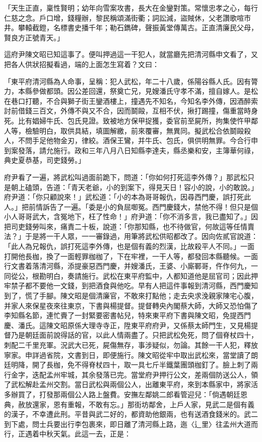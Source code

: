 \begin{showcontents}{}
「天生正直，稟性賢明；幼年向雪案攻書，長大在金鑾對策。常懷忠孝之心，每行仁慈之念。戶口增，錢糧辦，黎民稱頌滿街衢；詞訟減，盜賊休，父老讚歌喧市井。攀轅截鐙，名標書史播千年；勒石鐫碑，聲振黃堂傳萬古。正直清廉民父母，賢良方正號青天。」

這府尹陳文昭已知這事了。便叫押過這一干犯人，就當廳先把清河縣申文看了，又把各人供狀招擬看過，端的上面怎生寫着？文曰：

「東平府清河縣為人命事，呈稱：犯人武松，年二十八歲，係陽谷縣人氏。因有膂力，本縣參做都頭。因公差回還，祭奠亡兄，見嫂潘氏守孝不滿，擅自嫁人。是松在巷口打聽，不合與獅子街王鑾酒樓上，撞遇先不知名，今知名李外傳，因酒醉索討前借錢三百文，外傳不與又不合，因而鬬毆，互相不伏，揪打踢撞，傷重當時身死。比有娼婦牛氏、包氏見證。致被地方保甲捉獲，委官前至屍所，拘集使忤甲鄰人等，檢驗明白，取供具結，填圖解繳，前來覆審，無異同。擬武松合依鬬毆殺人，不問手足他物金刃，律絞。酒保王鸞，并牛氏、包氏，俱供明無罪。今合行申到案發落，請允施行。政和三年八月八日知縣李達夫，縣丞樂和安，主簿華何祿，典史夏恭基，司吏錢勞。」

府尹看了一遍，將武松叫過面前跪下，問道：「你如何打死這李外傳？」那武松只是朝上磕頭，告道：「青天老爺，小的到案下，得見天日！容小的說，小的敢說。」府尹道：「你只顧說來！」武松道：「小的本為哥哥報仇，因尋西門慶，誤打死此人。」把前情訴告了一遍。「委是小的負屈啣冤。西門慶錢大，禁他不得！但只是個小人哥哥武大，含冤地下，枉了性命！」府尹道：「你不消多言，我已盡知了。」因把司吏錢勞叫來，痛責二十板，說道：「你那知縣，也不待做官，何故這等任情賣法？」于是將一干人眾，一一審錄過，用筆將武松供昭都改了。因向佐貳官說道：「此人為兄報仇，誤打死這李外傳，也是個有義的烈漢，比故殺平人不同。」一面打開他長枷，換了一面輕罪枷枷了，下在牢裡，一干人等，都發回本縣聽候。一面行文書着落清河縣，添提豪惡西門慶，并嫂潘氏，王婆、小廝鄆哥，仵作何九，一同從公，根勘明白，奏請施行。武松在東平府監中，人都知道他是屈官司；因此押牢禁子都不要他一文錢，到把酒食與他吃。早有人把這件事報到清河縣，西門慶知到了，慌了手腳。陳文昭是個清廉官，不敢來打點他；走去央求浼親家陳宅心腹，并家人來保星夜來往東京，下書與楊提督。提督轉央內閣蔡大師，大師又恐怕傷了李知縣名節，連忙賷了一封緊要密書帖兒，特來東平府下書與陳文昭，免提西門慶、潘氏。這陳文昭原係大理寺寺正，陞東平府府尹，又係蔡太師門生，又見楊提督乃是朝廷面前說得話的官，以此人情兩盡了。只把武松免死，問了個脊杖四十，刺配二千里充軍。況武大已死，屍傷無存，事涉疑似，勿論。其餘一干人犯，釋放寧家。申詳過省院，文書到日，即便施行。陳文昭從牢中取出武松來，當堂讀了朗廷明降，開了長枷，免不得脊杖四十，取一具七斤半鐵葉團頭枷釘了。臉上刺了兩行金字，迭配孟州牢城，其余發落已完。當堂府尹押行公文，差兩個防送公人，領了武松解赴孟州交割。當日武松與兩個公人，出離東平府，來到本縣家中，將家活多辦買了，打發那兩個公人路上盤費。安撫左鄰姚二郎看管迎兒：「倘遇朝廷恩典，赦放還家，恩有重報，不敢有忘。」那街坊鄰舍，上戶人家，見武二是個有義的漢子，不幸遭此刑。平昔與武二好的，都資助他銀兩，也有送酒食錢米的。武二到下處，問士兵要出行李包裹來，即日離了清河縣上路，迤〈辶里〉往孟州大道而行，正遇着中秋天氣。此這一去，正是：


\end{showcontents}

